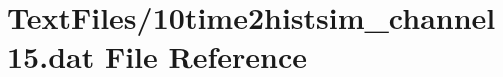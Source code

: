 \hypertarget{10time2histsim__channel15_8dat}{}\section{Text\+Files/10time2histsim\+\_\+channel15.dat File Reference}
\label{10time2histsim__channel15_8dat}
